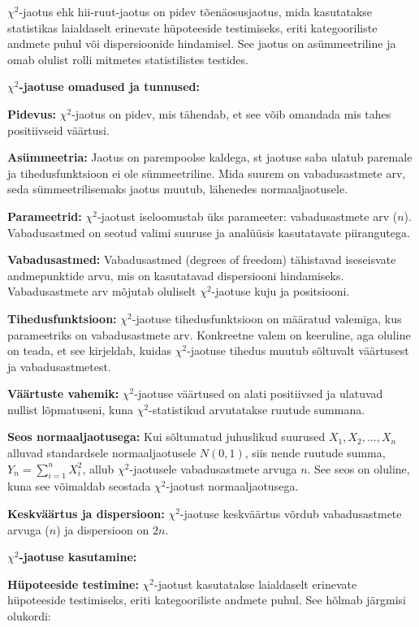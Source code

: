 \documentclass[
]{book}
\theoremstyle{definition}
\theoremstyle{definition}
\theoremstyle{definition}
\theoremstyle{definition}
\theoremstyle{remark}
\begin{document}
\(\chi^2\)-jaotus ehk hii-ruut-jaotus on pidev tõenäosusjaotus, mida kasutatakse statistikas laialdaselt erinevate hüpoteeside testimiseks, eriti kategooriliste andmete puhul või dispersioonide hindamisel. See jaotus on asümmeetriline ja omab olulist rolli mitmetes statistilistes testides.

\textbf{\(\chi^2\)-jaotuse omadused ja tunnused:}

\textbf{Pidevus:} \(\chi^2\)-jaotus on pidev, mis tähendab, et see võib omandada mis tahes positiivseid väärtusi.

\textbf{Asümmeetria:} Jaotus on parempoolse kaldega, st jaotuse saba ulatub paremale ja tihedusfunktsioon ei ole sümmeetriline. Mida suurem on vabadusastmete arv, seda sümmeetrilisemaks jaotus muutub, lähenedes normaaljaotusele.

\textbf{Parameetrid:} \(\chi^2\)-jaotust iseloomustab üks parameeter: vabadusastmete arv (\(n\)). Vabadusastmed on seotud valimi suuruse ja analüüsis kasutatavate piirangutega.

\textbf{Vabadusastmed:} Vabadusastmed (degrees of freedom) tähistavad iseseisvate andmepunktide arvu, mis on kasutatavad dispersiooni hindamiseks. Vabadusastmete arv mõjutab oluliselt \(\chi^2\)-jaotuse kuju ja positsiooni.

\textbf{Tihedusfunktsioon:} \(\chi^2\)-jaotuse tihedusfunktsioon on määratud valemiga, kus parameetriks on vabadusastmete arv. Konkreetne valem on keeruline, aga oluline on teada, et see kirjeldab, kuidas \(\chi^2\)-jaotuse tihedus muutub sõltuvalt väärtusest ja vabadusastmetest.

\textbf{Väärtuste vahemik:} \(\chi^2\)-jaotuse väärtused on alati positiivsed ja ulatuvad nullist lõpmatuseni, kuna \(\chi^2\)-statistikud arvutatakse ruutude summana.

\textbf{Seos normaaljaotusega:} Kui sõltumatud juhuslikud suurused \(X_1, X_2, ..., X_n\) alluvad standardsele normaaljaotusele \(N(0, 1)\), siis nende ruutude summa, \(Y_n = \sum_{i=1}^n X_i^2\), allub \(\chi^2\)-jaotusele vabadusastmete arvuga \(n\). See seos on oluline, kuna see võimaldab seostada \(\chi^2\)-jaotust normaaljaotusega.

\textbf{Keskväärtus ja dispersioon:} \(\chi^2\)-jaotuse keskväärtus võrdub vabadusastmete arvuga (\(n\)) ja dispersioon on \(2n\).

\textbf{\(\chi^2\)-jaotuse kasutamine:}

\textbf{Hüpoteeside testimine:} \(\chi^2\)-jaotust kasutatakse laialdaselt erinevate hüpoteeside testimiseks, eriti kategooriliste andmete puhul. See hõlmab järgmisi olukordi:
\end{document}
